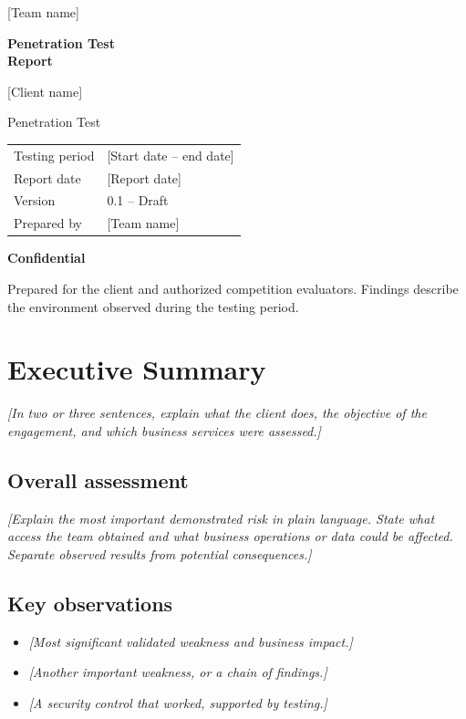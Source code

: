 \documentclass[11pt,letterpaper]{article}
\newcommand{\ClientName}{[Client name]}
\newcommand{\TeamName}{[Team name]}
\newcommand{\EngagementName}{Penetration Test}
\newcommand{\TestingDates}{[Start date -- end date]}
\newcommand{\ReportDate}{[Report date]}
\newcommand{\ReportVersion}{0.1 -- Draft}
\newcommand{\prompt}[1]{\textit{\textcolor{muted}{[#1]}}}
\begin{document}
\begin{titlepage}
  {\large\TeamName\par}
  \vspace{1.6in}
  {\Huge\bfseries\color{accent}Penetration Test\\[6pt]Report\par}
  \vspace{0.4in}
  {\LARGE\ClientName\par}
  {\large\EngagementName\par}
  \vspace{0.6in}
  \begin{tabular}{@{}ll@{}}
    Testing period & \TestingDates \\
    Report date & \ReportDate \\
    Version & \ReportVersion \\
    Prepared by & \TeamName
  \end{tabular}
  \vfill
  \textbf{Confidential}\par
  Prepared for the client and authorized competition evaluators.
  Findings describe the environment observed during the testing period.
\end{titlepage}

\tableofcontents
\clearpage
{}

\section{Executive Summary}
\prompt{In two or three sentences, explain what the client does, the objective
of the engagement, and which business services were assessed.}

\subsection*{Overall assessment}
\prompt{Explain the most important demonstrated risk in plain language.
State what access the team obtained and what business operations or data could
be affected. Separate observed results from potential consequences.}

\subsection*{Key observations}
\begin{itemize}
  \item \prompt{Most significant validated weakness and business impact.}
  \item \prompt{Another important weakness, or a chain of findings.}
  \item \prompt{A security control that worked, supported by testing.}
\end{itemize}
\end{document}
